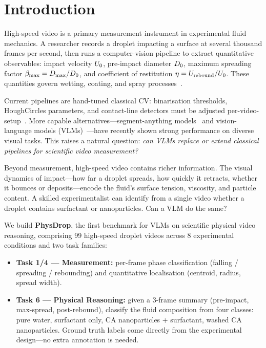 \documentclass[10pt,twocolumn,letterpaper]{article}
\begin{document}
\section{Introduction}
\label{sec:intro}

High-speed video is a primary measurement instrument in experimental fluid
mechanics. A researcher records a droplet impacting a surface at several
thousand frames per second, then runs a computer-vision pipeline to extract
quantitative observables: impact velocity $U_0$, pre-impact diameter
$D_0$, maximum spreading factor $\beta_{\max} = D_{\max}/D_0$, and
coefficient of restitution $\eta = U_{\text{rebound}}/U_0$.
These quantities govern wetting, coating, and spray
processes~\cite{yarin2006drop,richard2002surface}.

Current pipelines are hand-tuned classical CV: binarisation thresholds,
HoughCircles parameters, and contact-line detectors must be adjusted
per-video-setup~\cite{abbot2025nanoparticles,jereb2025droplet}.
More capable alternatives—segment-anything models~\cite{sam2_2024} and
vision-language models (VLMs)~\cite{qwen25vl,gpt4o,gemini2flash}—have
recently shown strong performance on diverse visual tasks.
This raises a natural question: \emph{can VLMs replace or extend classical
pipelines for scientific video measurement?}

Beyond measurement, high-speed video contains richer information.
The visual dynamics of impact—how far a droplet spreads, how quickly it
retracts, whether it bounces or deposits—encode the fluid's
surface tension, viscosity, and particle content.
A skilled experimentalist can identify from a single video whether a droplet
contains surfactant or nanoparticles.
Can a VLM do the same?

We build \textbf{PhysDrop}, the first benchmark for VLMs on scientific
physical video reasoning, comprising 99 high-speed droplet videos across
8 experimental conditions and two task families:
\begin{itemize}[leftmargin=*, topsep=2pt, itemsep=1pt]
  \item \textbf{Task 1/4 — Measurement:} per-frame phase classification
    (falling / spreading / rebounding) and quantitative localisation
    (centroid, radius, spread width).
  \item \textbf{Task 6 — Physical Reasoning:} given a 3-frame summary
    (pre-impact, max-spread, post-rebound), classify the fluid composition
    from four classes: pure water, surfactant only,
    CA nanoparticles + surfactant, washed CA nanoparticles.
    Ground truth labels come directly from the experimental design—no extra
    annotation is needed.
\end{itemize}
\end{document}
